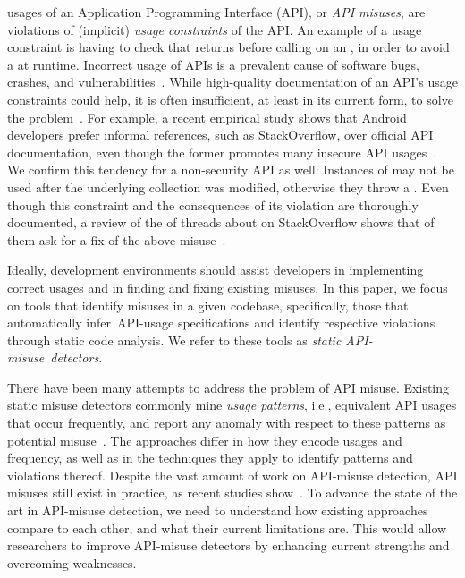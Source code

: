 


 usages of an Application Programming Interface (API), or \emph{API misuses}, are violations of (implicit) \emph{usage constraints} of the API. 
An example of a usage constraint is having to check that  returns  before calling  on an , in order to avoid a  at runtime.
Incorrect usage of APIs is a prevalent cause of software bugs, crashes, and vulnerabilities~\cite{MM13,SHA15,ANNN+16,FHMB+12,EBFK13,NKMB16,GIJA+12}.
While high-quality documentation of an API's usage constraints could help, it is often insufficient, at least in its current form, to solve the problem~\cite{DH09}.
For example, a recent empirical study shows that Android developers prefer informal references, such as StackOverflow, over official API documentation, even though the former promotes many insecure API usages~\cite{ABFKMS16}.
We confirm this tendency for a non-security API as well:
Instances of  may not be used after the underlying collection was modified, otherwise they throw a .
Even though this constraint and the consequences of its violation are thoroughly documented, a review of the  of  threads about  on StackOverflow shows that  of them ask for a fix of the above misuse~\cite{artifact-page}.

Ideally, development environments should assist developers in implementing correct usages and in finding and fixing existing misuses.
In this paper, we focus on tools that identify misuses in a given codebase, specifically, those that automatically infer~API-usage specifications and identify respective violations through static code analysis.
We refer to these tools as \emph{static API-misuse~detectors}.

There have been many attempts to address the problem of API misuse.
Existing static misuse detectors commonly mine \textit{usage patterns}, i.e., equivalent API usages that occur frequently, and report any anomaly with respect to these patterns as potential misuse~\cite{LZ05,L07,WZL07,RGJ07,NNP+09,AX09,TX09,TX09b,WZ11,MM13,NPVN16}.
The approaches differ in how they encode usages and frequency, as well as in the techniques they apply to identify patterns and violations thereof.
Despite the vast amount of work on API-misuse detection, API misuses still exist in practice, as recent studies show~\cite{LHXRM16,ABFKMS16}.
To advance the state of the art in API-misuse detection, we need to understand how existing approaches compare to each other, and what their current limitations are.
This would allow researchers to improve API-misuse detectors by enhancing current strengths and overcoming weaknesses.


